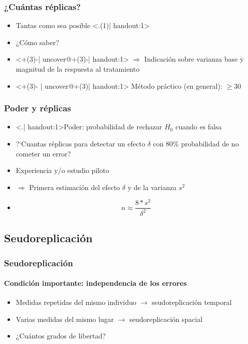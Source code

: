 \documentclass[mathserif]{beamer}
\begin{document}
\begin{frame}[label=manyrep]
   \frametitle{¿Cu\'antas r\'eplicas?}
   \begin{itemize}[<+(1)-| uncover@+(1)-| handout:1>]
      \item Tantas como sea posible \alert<.(1)| handout:1>{\smiley}
      \medskip
      \item<3- | uncover@3-| handout:1> ¿C\'omo saber? 
      \item[ ]<+(3)-| uncover@+(3)-| handout:1> $\Rightarrow$ Indicaci\'on sobre varianza base y magnitud de la respuesta al tratamiento
      \medskip
      \item<+(3)- | uncover@+(3)| handout:1> M\'etodo pr\'actico (en general): $\geq 30 $
   \end{itemize}
\end{frame}%


\begin{frame}[label=power2]
   \frametitle{Poder y r\'eplicas}
   \begin{itemize}[<+-| visible@+-| handout:1>]
      \item \alert<.| handout:1>{Poder: probabilidad de rechazar $H_0$ cuando es falsa}
      \item ?`Cuantas r\'eplicas para detectar un efecto $\delta$ con $80\%$ probabilidad de no cometer un error?
      \item Experiencia y/o estudio piloto
      \item[] $\Rightarrow$ Primera estimaci\'on del efecto $\delta$ y de la varianza $s^2$
      \item $$n\approx \frac{8*s^2}{\delta^2}$$
   \end{itemize}
   \medskip
\end{frame}%


\subsection[Seudoreplicaci\'on]{Seudoreplicaci\'on}

\begin{frame}[label=pseudorep1]
   \frametitle{Seudoreplicaci\'on}
   \framesubtitle{Condici\'on importante: independencia de los errores}
   \begin{itemize}
      \item Medidas repetidas del mismo individuo $\rightarrow$ seudoreplicaci\'on temporal 
      \item Varias medidas del mismo lugar $\rightarrow$ seudoreplicaci\'on spacial 
      \medskip 
      \item ¿Cu\'antos grados de libertad?
   \end{itemize}
\end{frame}%
\end{document}
